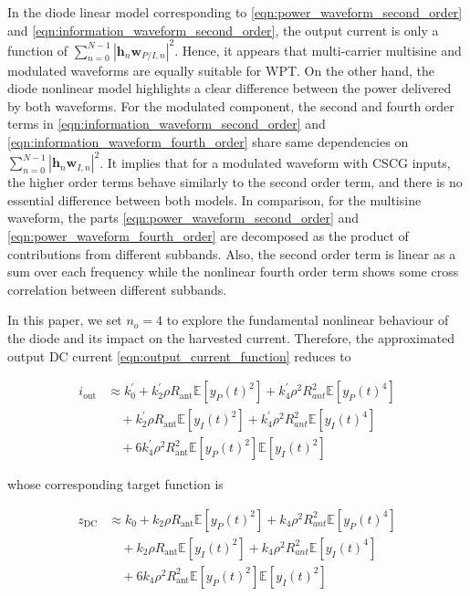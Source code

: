 In the diode linear model corresponding to \eqref{eqn:power_waveform_second_order} and \eqref{eqn:information_waveform_second_order}, the output current is only a function of $\sum\limits_{n = 0}^{N - 1} {{{\left| {{{\mathbf{h}}_n}{{\mathbf{w}}_{P/I,n}}} \right|}^2}} $. Hence, it appears that multi-carrier multisine and modulated waveforms are equally suitable for WPT. On the other hand, the diode nonlinear model highlights a clear difference between the power delivered by both waveforms. For the modulated component, the second and fourth order terms in \eqref{eqn:information_waveform_second_order} and \eqref{eqn:information_waveform_fourth_order} share same dependencies on ${\sum\limits_{n = 0}^{N - 1} {{{\left| {{{\mathbf{h}}_n}{{\mathbf{w}}_{I,n}}} \right|}^2}} }$. It implies that for a modulated waveform with CSCG inputs, the higher order terms behave similarly to the second order term, and there is no essential difference between both models. In comparison, for the multisine waveform, the parts \eqref{eqn:power_waveform_second_order} and \eqref{eqn:power_waveform_fourth_order} are decomposed as the product of contributions from different subbands. Also, the second order term is linear as a sum over each frequency while the nonlinear fourth order term shows some cross correlation between different subbands.

In this paper, we set ${n_o} = 4$ to explore the fundamental nonlinear behaviour of the diode and its impact on the harvested current. Therefore, the approximated output DC current \eqref{eqn:output_current_function} reduces to

\begin{align}\label{eqn:output_current_truncated}
  {i_{\text{out}}} &\approx k_0^\prime  + k_2^\prime \rho {R_{{\text{ant}}}}\mathbb{E}\left[ {{y_P}{{(t)}^2}} \right] + k_4^\prime {\rho ^2}R_{ant}^2\mathbb{E}\left[ {{y_P}{{(t)}^4}} \right] \nonumber \\
   &\quad + k_2^\prime \rho {R_{{\text{ant}}}}\mathbb{E}\left[ {{y_I}{{(t)}^2}} \right] + k_4^\prime {\rho ^2}R_{ant}^2\mathbb{E}\left[ {{y_I}{{(t)}^4}} \right] \nonumber \\
   &\quad + 6k_4^\prime {\rho ^2}R_{{\text{ant}}}^2\mathbb{E}\left[ {{y_P}{{(t)}^2}} \right]\mathbb{E}\left[ {{y_I}{{(t)}^2}} \right]
\end{align}

whose corresponding target function is

\begin{align}\label{eqn:target_function_truncated}
  {z_{\text{DC}}} &\approx k_0  + k_2 \rho {R_{{\text{ant}}}}\mathbb{E}\left[ {{y_P}{{(t)}^2}} \right] + k_4 {\rho ^2}R_{ant}^2\mathbb{E}\left[ {{y_P}{{(t)}^4}} \right] \nonumber \\
   &\quad + k_2 \rho {R_{{\text{ant}}}}\mathbb{E}\left[ {{y_I}{{(t)}^2}} \right] + k_4 {\rho ^2}R_{ant}^2\mathbb{E}\left[ {{y_I}{{(t)}^4}} \right] \nonumber \\
   &\quad + 6k_4 {\rho ^2}R_{{\text{ant}}}^2\mathbb{E}\left[ {{y_P}{{(t)}^2}} \right]\mathbb{E}\left[ {{y_I}{{(t)}^2}} \right]
\end{align} 